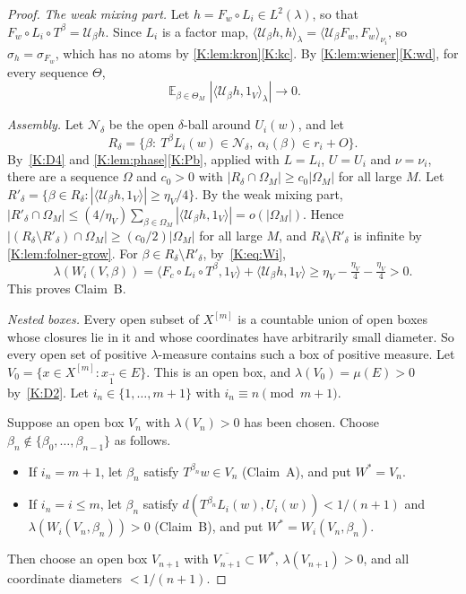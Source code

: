 \begin{proof}
\emph{The weak mixing part.}
Let $h=F_w\circ L_i\in L^2(\lambda)$, so that $F_w\circ L_i\circ T^\beta=\mathcal U_\beta h$.
Since $L_i$ is a factor map,
$\langle\mathcal U_\beta h,h\rangle_\lambda=\langle\mathcal U_\beta F_w,F_w\rangle_{\nu_i}$, so
$\sigma_h=\sigma_{F_w}$, which has no atoms by \cref{K:lem:kron}\ref{K:kc}.
By \cref{K:lem:wiener}\ref{K:wd}, for every \Fol{} sequence $\Theta$,
\[
\mathop{\mathbb E}_{\beta\in\Theta_M}|\langle\mathcal U_\beta h,1_V\rangle_\lambda|\to0 .
\]

\emph{Assembly.}
Let $\mathcal N_\delta$ be the open $\delta$-ball around $U_i(w)$, and let
\[
R_\delta=\{\beta:\ T^\beta L_i(w)\in\mathcal N_\delta,\ \alpha_i(\beta)\in r_i+O\}.
\]
By~\ref{K:D4} and \cref{K:lem:phase}\ref{K:Pb}, applied with $L=L_i$, $U=U_i$ and
$\nu=\nu_i$, there are a \Fol{} sequence $\Omega$ and $c_0>0$ with
$|R_\delta\cap\Omega_M|\ge c_0|\Omega_M|$ for all large $M$.
Let $R'_\delta=\{\beta\in R_\delta:|\langle\mathcal U_\beta h,1_V\rangle|\ge\eta_V/4\}$. By the weak
mixing part,
$|R'_\delta\cap\Omega_M|\le(4/\eta_V)\sum_{\beta\in\Omega_M}|\langle\mathcal U_\beta h,1_V\rangle|=o(|\Omega_M|)$.
Hence $|(R_\delta\setminus R'_\delta)\cap\Omega_M|\ge(c_0/2)|\Omega_M|$ for all large $M$, and
$R_\delta\setminus R'_\delta$ is infinite by \cref{K:lem:folner-grow}.
For $\beta\in R_\delta\setminus R'_\delta$, by~\eqref{K:eq:Wi},
\[
\lambda(W_i(V,\beta))=\langle F_c\circ L_i\circ T^\beta,1_V\rangle+\langle\mathcal U_\beta h,1_V\rangle
\ge\eta_V-\tfrac{\eta_V}4-\tfrac{\eta_V}4>0 .
\]
This proves Claim~B.

\smallskip\noindent\emph{Nested boxes.}
Every open subset of $X^{[m]}$ is a countable union of open boxes whose closures lie in it
and whose coordinates have arbitrarily small diameter. So every open set of positive
$\lambda$-measure contains such a box of positive measure.
Let $V_0=\{x\in X^{[m]}:x_{\vec1}\in E\}$. This is an open box, and
$\lambda(V_0)=\mu(E)>0$ by~\ref{K:D2}.
Let $i_n\in\{1,\dots,m+1\}$ with $i_n\equiv n\pmod{m+1}$.

Suppose an open box $V_n$ with $\lambda(V_n)>0$ has been chosen. Choose
$\beta_n\notin\{\beta_0,\dots,\beta_{n-1}\}$ as follows.
\begin{itemize}
\item If $i_n=m+1$, let $\beta_n$ satisfy $T^{\beta_n}w\in V_n$ (Claim~A), and put $W^*=V_n$.
\item If $i_n=i\le m$, let $\beta_n$ satisfy $d(T^{\beta_n}L_i(w),U_i(w))<1/(n+1)$ and
$\lambda(W_i(V_n,\beta_n))>0$ (Claim~B), and put $W^*=W_i(V_n,\beta_n)$.
\end{itemize}
Then choose an open box $V_{n+1}$ with $\overline{V_{n+1}}\subset W^*$, $\lambda(V_{n+1})>0$, and all
coordinate diameters $<1/(n+1)$.


\end{proof}
